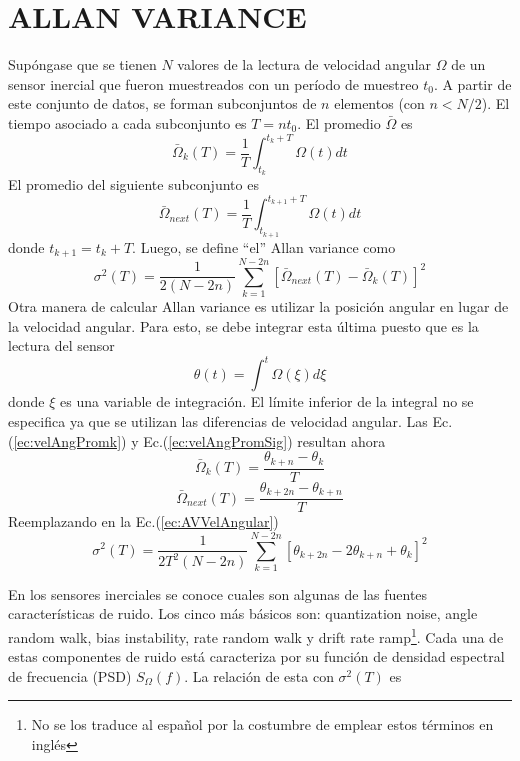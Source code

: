 \documentclass[a4paper,11pt,twoside]{IT-CNEA}
\begin{document}
\section{ALLAN VARIANCE}
Supóngase que se tienen $N$ valores de la lectura de velocidad angular $\Omega$ de un sensor inercial que fueron muestreados con un período de muestreo $t_0$. A partir de este conjunto de datos, se forman subconjuntos de $n$ elementos (con $n<N/2$). El tiempo asociado a cada subconjunto es $T=nt_0$. El promedio $\bar{\Omega}$ es
\begin{equation}
\bar{\Omega}_k(T)=\frac{1}{T}\int_{t_k}^{t_k+T}\Omega(t)dt
\label{ec:velAngPromk}
\end{equation}
El promedio del siguiente subconjunto es
\begin{equation}
\bar{\Omega}_{next}(T)=\frac{1}{T}\int_{t_{k+1}}^{t_{k+1}+T}\Omega(t)dt
\label{ec:velAngPromSig}
\end{equation}
donde $t_{k+1}=t_k+T$. Luego, se define ``el'' Allan variance como
\begin{equation}
\sigma^2(T)=\frac{1}{2\left( N-2n\right)}\sum_{k=1}^{N-2n}\left[\bar{\Omega}_{next}(T)- \bar{\Omega}_k(T)\right]^2
\label{ec:AVVelAngular}
\end{equation}
Otra manera de calcular Allan variance es utilizar la posición angular en lugar de la velocidad angular. Para esto, se debe integrar esta última puesto que es la lectura del sensor
\begin{equation}
\theta(t)=\int^t\Omega(\xi)d\xi
\end{equation}
donde $\xi$ es una variable de integración. El límite inferior de la integral no se especifica ya que se utilizan las diferencias de velocidad angular. Las Ec.(\ref{ec:velAngPromk}) y Ec.(\ref{ec:velAngPromSig}) resultan ahora
\begin{equation}
\bar{\Omega}_{k}(T)=\frac{\theta_{k+n}-\theta_k}{T}
\end{equation}
\begin{equation}
\bar{\Omega}_{next}(T)=\frac{\theta_{k+2n}-\theta_{k+n}}{T}
\end{equation}
Reemplazando en la Ec.(\ref{ec:AVVelAngular})
\begin{equation}
\sigma^2(T)=\frac{1}{2T^2\left( N-2n\right)}\sum_{k=1}^{N-2n}\left[ \theta_{k+2n}-2\theta_{k+n}+\theta_k \right]^2
\label{ec:AVPosAngular}
\end{equation}
\par En los sensores inerciales se conoce cuales son algunas de las fuentes características de ruido. Los cinco más básicos son: quantization noise, angle random walk, bias instability, rate random walk y drift rate ramp\footnote{No se los traduce al español por la costumbre de emplear estos términos en inglés}. Cada una de estas componentes de ruido está caracteriza por su función de densidad espectral de frecuencia (PSD) $S_{\Omega}(f)$. La relación de esta con $\sigma^2(T)$  es
\end{document}
